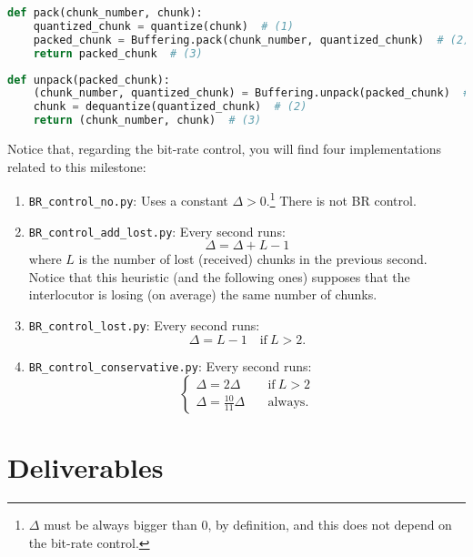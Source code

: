 \begin{lstlisting}[language=Python]
  def pack(chunk_number, chunk):
    quantized_chunk = quantize(chunk)  # (1)
    packed_chunk = Buffering.pack(chunk_number, quantized_chunk)  # (2)
    return packed_chunk  # (3)
\end{lstlisting}

\begin{lstlisting}[language=Python]
  def unpack(packed_chunk):
    (chunk_number, quantized_chunk) = Buffering.unpack(packed_chunk)  # (1)
    chunk = dequantize(quantized_chunk)  # (2)
    return (chunk_number, chunk)  # (3)
\end{lstlisting}

Notice that, regarding the bit-rate control, you will find four
implementations related to this milestone:
\begin{enumerate}
\item \verb|BR_control_no.py|: Uses a constant
  $\Delta>0$.\footnote{$\Delta$ must be always bigger than $0$, by
definition, and this does not depend on the bit-rate control.} There
  is not BR control.
\item \verb|BR_control_add_lost.py|: Every second runs:
  \begin{equation}
    \Delta = \Delta + L - 1
  \end{equation}
  where $L$ is the number of lost (received) chunks in the previous
  second. Notice that this heuristic (and the following ones) supposes
  that the interlocutor is losing (on average) the same number of
  chunks.
\item \verb|BR_control_lost.py|: Every second runs:
  \begin{equation}
    \Delta = L - 1\quad\text{if}~L>2.
  \end{equation}
\item \verb|BR_control_conservative.py|: Every second runs:
  \begin{equation}
    \left\{
    \begin{array}{ll}
      \Delta = 2\Delta & \quad\text{if}~L>2 \\
      \Delta = \frac{10}{11}\Delta & \quad\text{always}.
    \end{array}
    \right.
  \end{equation}
\end{enumerate}


\section{Deliverables}

